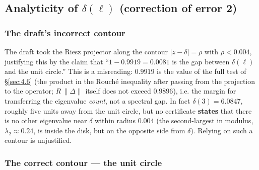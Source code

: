 \subsection{Analyticity of $\delta(\ell)$ (correction of error 2)}
\label{sec:6.8}

\subsubsection{The draft's incorrect contour}
\label{sec:6.8.1}

The draft took the Riesz projector along the contour $|z-\delta|=\rho$ with
$\rho<0.004$, justifying this by the claim that ``$1-0.9919=0.0081$ is the gap
between $\delta(\ell)$ and the unit circle.'' This is a misreading: $0.9919$
is the value of the full test of \S\ref{sec:4.6} (the product in the Rouché inequality
after passing from the projection to the operator; $R\,\|\Delta\|$ itself
does not exceed $0.9896$), i.e. the margin for transferring the eigenvalue
\emph{count}, not a spectral gap. In fact $\delta(3)=6.0847$, roughly five units
away from the unit circle, but no certificate \textbf{states} that there is no
other eigenvalue near $\delta$ within radius $0.004$ (the second-largest in
modulus, $\lambda_2\approx0.24$, is inside the disk, but on the opposite side
from $\delta$). Relying on such a contour is unjustified.

\subsubsection{The correct contour --- the unit circle}
\label{sec:6.8.2}

